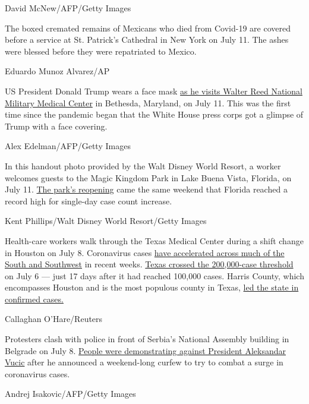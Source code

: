 David McNew/AFP/Getty Images

The boxed cremated remains of Mexicans who died from Covid-19 are
covered before a service at St. Patrick's Cathedral in New York on July
11. The ashes were blessed before they were repatriated to Mexico.

Eduardo Munoz Alvarez/AP

US President Donald Trump wears a face mask
\href{https://www.cnn.com/2020/07/11/politics/trump-walter-reed-visit-mask/index.html}{as
he visits Walter Reed National Military Medical Center} in Bethesda,
Maryland, on July 11. This was the first time since the pandemic began
that the White House press corps got a glimpse of Trump with a face
covering.

Alex Edelman/AFP/Getty Images

In this handout photo provided by the Walt Disney World Resort, a worker
welcomes guests to the Magic Kingdom Park in Lake Buena Vista, Florida,
on July 11.
\href{https://www.cnn.com/travel/article/disney-masks-covid-rides-trnd/index.html}{The
park's reopening} came the same weekend that Florida reached a record
high for single-day case count increase.

Kent Phillips/Walt Disney World Resort/Getty Images

Health-care workers walk through the Texas Medical Center during a shift
change in Houston on July 8. Coronavirus cases
\href{https://www.cnn.com/interactive/2020/health/coronavirus-us-maps-and-cases/}{have
accelerated across much of the South and Southwest} in recent weeks.
\href{https://www.cnn.com/2020/07/07/politics/florida-texas-governors-coronavirus/index.html}{Texas
crossed the 200,000-case threshold} on July 6 --- just 17 days after it
had reached 100,000 cases. Harris County, which encompasses Houston and
is the most populous county in Texas,
\href{https://www.cnn.com/2020/07/08/politics/houston-texas-republican-convention-contract/index.html}{led
the state in confirmed cases.}

Callaghan O'Hare/Reuters

Protesters clash with police in front of Serbia's National Assembly
building in Belgrade on July 8.
\href{https://edition.cnn.com/world/live-news/coronavirus-pandemic-07-08-20-intl/h_570a4c52facd841fd36b61439b06ef63}{People
were demonstrating against President Aleksandar Vucic} after he
announced a weekend-long curfew to try to combat a surge in coronavirus
cases.

Andrej Isakovic/AFP/Getty Images

